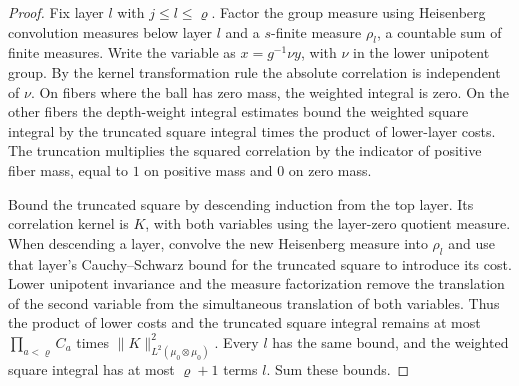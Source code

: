 \begin{proof}
Fix layer $l$ with $j\le l\le\varrho$. Factor the group measure using Heisenberg convolution measures below layer $l$ and a $s$-finite measure $\rho_l$, a countable sum of finite measures. Write the variable as $x=g^{-1}\nu y$, with $\nu$ in the lower unipotent group. By the kernel transformation rule the absolute correlation is independent of $\nu$. On fibers where the ball has zero mass, the weighted integral is zero. On the other fibers the depth-weight integral estimates bound the weighted square integral by the truncated square integral times the product of lower-layer costs. The truncation multiplies the squared correlation by the indicator of positive fiber mass, equal to $1$ on positive mass and $0$ on zero mass.

Bound the truncated square by descending induction from the top layer. Its correlation kernel is $K$, with both variables using the layer-zero quotient measure. When descending a layer, convolve the new Heisenberg measure into $\rho_l$ and use that layer's Cauchy--Schwarz bound for the truncated square to introduce its cost. Lower unipotent invariance and the measure factorization remove the translation of the second variable from the simultaneous translation of both variables. Thus the product of lower costs and the truncated square integral remains at most $\prod_{a<\varrho}C_a$ times $\|K\|_{L^2(\mu_0\otimes\mu_0)}^2$. Every $l$ has the same bound, and the weighted square integral has at most $\varrho+1$ terms $l$. Sum these bounds.
\end{proof}

